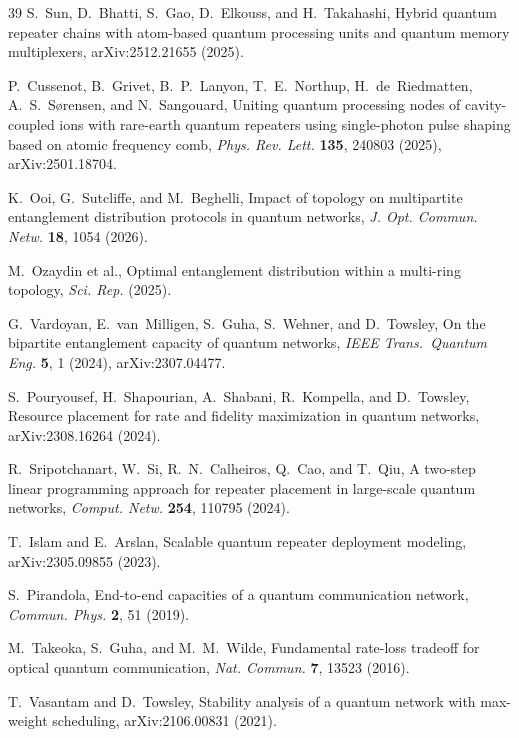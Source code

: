 \documentclass[quantumrep,article,submit,moreauthors]{Definitions/mdpi}
\begin{document}
\begin{thebibliography}{39}
S.~Sun, D.~Bhatti, S.~Gao, D.~Elkouss, and H.~Takahashi,
Hybrid quantum repeater chains with atom-based quantum processing units and quantum memory multiplexers,
arXiv:2512.21655 (2025).

P.~Cussenot, B.~Grivet, B.~P.~Lanyon, T.~E.~Northup, H.~de~Riedmatten, A.~S.~S{\o}rensen, and N.~Sangouard,
Uniting quantum processing nodes of cavity-coupled ions with rare-earth quantum repeaters using single-photon pulse shaping based on atomic frequency comb,
\textit{Phys. Rev. Lett.} \textbf{135}, 240803 (2025), arXiv:2501.18704.

K.~Ooi, G.~Sutcliffe, and M.~Beghelli,
Impact of topology on multipartite entanglement distribution protocols in quantum networks,
\textit{J. Opt. Commun. Netw.} \textbf{18}, 1054 (2026).

M.~Ozaydin et al.,
Optimal entanglement distribution within a multi-ring topology,
\textit{Sci. Rep.} (2025).

G.~Vardoyan, E.~van~Milligen, S.~Guha, S.~Wehner, and D.~Towsley,
On the bipartite entanglement capacity of quantum networks,
\textit{IEEE Trans.\ Quantum Eng.} \textbf{5}, 1 (2024), arXiv:2307.04477.

S.~Pouryousef, H.~Shapourian, A.~Shabani, R.~Kompella, and D.~Towsley,
Resource placement for rate and fidelity maximization in quantum networks,
arXiv:2308.16264 (2024).

R.~Sripotchanart, W.~Si, R.~N.~Calheiros, Q.~Cao, and T.~Qiu,
A two-step linear programming approach for repeater placement in large-scale quantum networks,
\textit{Comput. Netw.} \textbf{254}, 110795 (2024).

T.~Islam and E.~Arslan,
Scalable quantum repeater deployment modeling,
arXiv:2305.09855 (2023).

S.~Pirandola,
End-to-end capacities of a quantum communication network,
\textit{Commun. Phys.} \textbf{2}, 51 (2019).

M.~Takeoka, S.~Guha, and M.~M.~Wilde,
Fundamental rate-loss tradeoff for optical quantum communication,
\textit{Nat. Commun.} \textbf{7}, 13523 (2016).

T.~Vasantam and D.~Towsley,
Stability analysis of a quantum network with max-weight scheduling,
arXiv:2106.00831 (2021).


\end{thebibliography}
\end{document}

